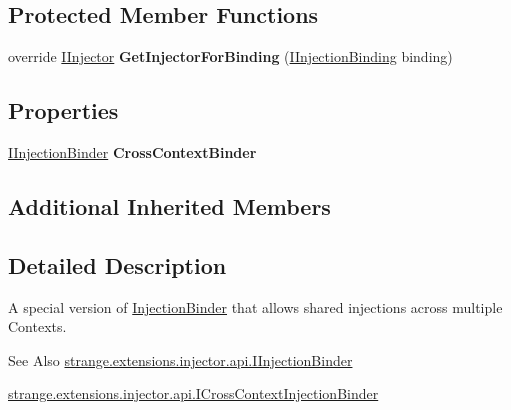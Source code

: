 \subsection*{Protected Member Functions}
\begin{DoxyCompactItemize}
\item 
\hypertarget{classstrange_1_1extensions_1_1injector_1_1impl_1_1_cross_context_injection_binder_a03faea5c258e2557cb67031d58df3041}{override \hyperlink{interfacestrange_1_1extensions_1_1injector_1_1api_1_1_i_injector}{I\-Injector} {\bfseries Get\-Injector\-For\-Binding} (\hyperlink{interfacestrange_1_1extensions_1_1injector_1_1api_1_1_i_injection_binding}{I\-Injection\-Binding} binding)}\label{classstrange_1_1extensions_1_1injector_1_1impl_1_1_cross_context_injection_binder_a03faea5c258e2557cb67031d58df3041}

\end{DoxyCompactItemize}
\subsection*{Properties}
\begin{DoxyCompactItemize}
\item 
\hypertarget{classstrange_1_1extensions_1_1injector_1_1impl_1_1_cross_context_injection_binder_acb7ba99973c93cb3435227803434c6ca}{\hyperlink{interfacestrange_1_1extensions_1_1injector_1_1api_1_1_i_injection_binder}{I\-Injection\-Binder} {\bfseries Cross\-Context\-Binder}}\label{classstrange_1_1extensions_1_1injector_1_1impl_1_1_cross_context_injection_binder_acb7ba99973c93cb3435227803434c6ca}

\end{DoxyCompactItemize}
\subsection*{Additional Inherited Members}


\subsection{Detailed Description}
A special version of \hyperlink{classstrange_1_1extensions_1_1injector_1_1impl_1_1_injection_binder}{Injection\-Binder} that allows shared injections across multiple Contexts. 

\begin{DoxySeeAlso}{See Also}
\hyperlink{interfacestrange_1_1extensions_1_1injector_1_1api_1_1_i_injection_binder}{strange.\-extensions.\-injector.\-api.\-I\-Injection\-Binder} 

\hyperlink{interfacestrange_1_1extensions_1_1injector_1_1api_1_1_i_cross_context_injection_binder}{strange.\-extensions.\-injector.\-api.\-I\-Cross\-Context\-Injection\-Binder} 
\end{DoxySeeAlso}


